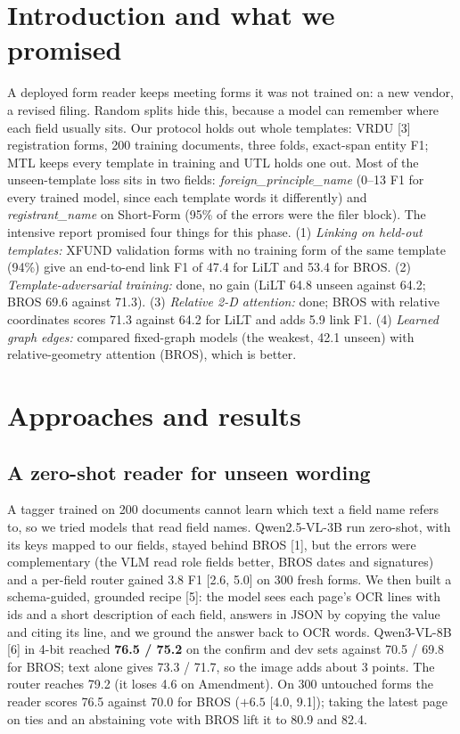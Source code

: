 \documentclass[10pt,a4paper]{article}
\begin{document}
\section{Introduction and what we promised}
A deployed form reader keeps meeting forms it was not trained on: a new vendor, a revised filing. Random splits hide this, because a model can remember where each field usually sits. Our protocol holds out whole templates: VRDU [3] registration forms, 200 training documents, three folds, exact-span entity F1; MTL keeps every template in training and UTL holds one out. Most of the unseen-template loss sits in two fields: \emph{foreign\_principle\_name} (0--13 F1 for every trained model, since each template words it differently) and \emph{registrant\_name} on Short-Form (95\% of the errors were the filer block). The intensive report promised four things for this phase. (1) \emph{Linking on held-out templates:} XFUND validation forms with no training form of the same template (94\%) give an end-to-end link F1 of 47.4 for LiLT and 53.4 for BROS. (2) \emph{Template-adversarial training:} done, no gain (LiLT 64.8 unseen against 64.2; BROS 69.6 against 71.3). (3) \emph{Relative 2-D attention:} done; BROS with relative coordinates scores 71.3 against 64.2 for LiLT and adds 5.9 link F1. (4) \emph{Learned graph edges:} compared fixed-graph models (the weakest, 42.1 unseen) with relative-geometry attention (BROS), which is better.

\section{Approaches and results}
\subsection{A zero-shot reader for unseen wording}
A tagger trained on 200 documents cannot learn which text a field name refers to, so we tried models that read field names. Qwen2.5-VL-3B run zero-shot, with its keys mapped to our fields, stayed behind BROS [1], but the errors were complementary (the VLM read role fields better, BROS dates and signatures) and a per-field router gained 3.8 F1 [2.6, 5.0] on 300 fresh forms. We then built a schema-guided, grounded recipe [5]: the model sees each page's OCR lines with ids and a short description of each field, answers in JSON by copying the value and citing its line, and we ground the answer back to OCR words. Qwen3-VL-8B [6] in 4-bit reached \textbf{76.5 / 75.2} on the confirm and dev sets against 70.5 / 69.8 for BROS; text alone gives 73.3 / 71.7, so the image adds about 3 points. The router reaches 79.2 (it loses 4.6 on Amendment). On 300 untouched forms the reader scores 76.5 against 70.0 for BROS ($+6.5$ [4.0, 9.1]); taking the latest page on ties and an abstaining vote with BROS lift it to 80.9 and 82.4.
\end{document}
